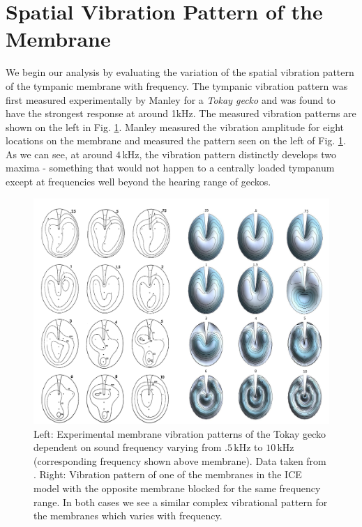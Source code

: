 \section{Spatial Vibration Pattern of the Membrane}\label{vibrationpatternchapter}
We begin our analysis by evaluating the variation of the spatial vibration pattern of the tympanic membrane
with frequency. The tympanic vibration pattern was first measured experimentally by Manley \cite{manleygecko1}
for a \emph{Tokay gecko} and was found to have the strongest response at around 1kHz. The measured vibration patterns
are shown on the left in Fig. \ref{manleygeckotympanum}. Manley measured the vibration amplitude for eight locations on the membrane and measured the pattern
seen on the left of Fig. \ref{manleygeckotympanum}. As we can see, at around $4\,$kHz, the vibration pattern
distinctly develops two maxima - something that would not happen to a centrally loaded tympanum except
at frequencies well beyond the hearing range of geckos.
\begin{figure}[ht!]
 \centering
 \includegraphics[width=1.0\linewidth]{Diagrams/manleymodelcomparison.png}
 \caption[Tympanic membrane vibration profiles for the Tokay gecko.]{Left: Experimental membrane vibration patterns of the Tokay gecko dependent
 on sound frequency varying from $.5\,$kHz to $10\,$kHz (corresponding frequency shown above membrane). Data taken from \cite{manleygecko1}. Right: Vibration
 pattern of one of the membranes in the ICE model with the opposite membrane blocked for the same frequency range. In both cases we see a similar
 complex vibrational pattern for the membranes which varies with frequency.}
  \label{manleygeckotympanum}
\end{figure}

